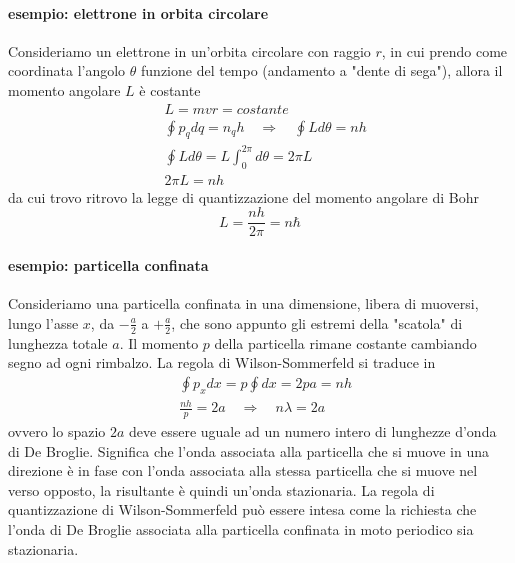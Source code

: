 \paragraph{esempio: elettrone in orbita circolare}
Consideriamo un elettrone in un'orbita circolare con raggio $r$, in cui prendo come coordinata l'angolo $\theta$ funzione del tempo (andamento a "dente di sega"), allora il momento angolare $L$ è costante
\begin{equation}
\begin{split}
& L = mvr = costante \\
& \oint p_q dq = n_q h \quad\Rightarrow\quad \oint L d\theta = n h \\
& \oint L d\theta = L \int_{0}^{2\pi} d\theta = 2\pi L \\
& 2\pi L = n h
\end{split}
\end{equation}
da cui trovo ritrovo la legge di quantizzazione del momento angolare di Bohr
\begin{equation}
L = \frac{ n h}{2 \pi } = n \hbar
\end{equation}


\paragraph{esempio: particella confinata}
Consideriamo una particella confinata in una dimensione, libera di muoversi, lungo l'asse $x$, da $-\frac{ a}{2 }$ a $+\frac{ a}{2 }$, che sono appunto gli estremi della "scatola" di lunghezza totale $a$.
Il momento $p$ della particella rimane costante cambiando segno ad ogni rimbalzo.
La regola di Wilson-Sommerfeld si traduce in
\begin{equation}
\begin{split}
& \oint p_x dx = p \oint dx = 2 p a = n h \\
& \frac{ n h }{p } = 2 a \quad\Rightarrow\quad n\lambda = 2a
\end{split}
\end{equation}
ovvero lo spazio $2a$ deve essere uguale ad un numero intero di lunghezze d'onda di De Broglie.
Significa che l'onda associata alla particella che si muove in una direzione è in fase con l'onda associata alla stessa particella che si muove nel verso opposto, la risultante è quindi un'onda stazionaria.
La regola di quantizzazione di Wilson-Sommerfeld può essere intesa come la richiesta che l'onda di De Broglie associata alla particella confinata in moto periodico sia stazionaria.







